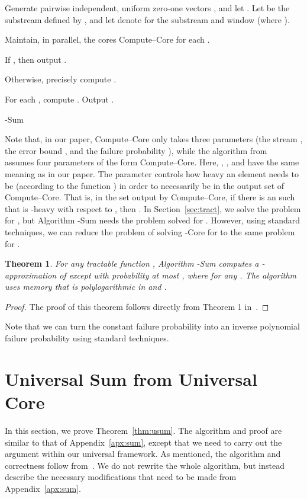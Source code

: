 \documentclass[11pt]{article}
\newtheorem{thm}{Theorem}
\begin{document}
\bigskip

\begin{algorithm}[H]\label{alg:gsum}
\DontPrintSemicolon
Generate  pairwise independent, uniform zero-one vectors ,
and let .
Let  be the substream defined by , and let  denote
 for the substream 
and window  (where ). \;

Maintain, in parallel, the cores  Compute--Core for each . \;

If , then output . \;

Otherwise, precisely compute . \;

For each , compute . \;
Output . \;
\caption{-Sum}
\end{algorithm}

Note that, in our paper, Compute--Core only takes three parameters (the stream , the
error bound , and the failure probability ), while the algorithm from~\cite{BO13} assumes
four parameters of the form Compute--Core.  Here, , , and 
have the same meaning as in our paper.  The parameter  controls how heavy an element needs to be
(according to the function ) in order to necessarily be in the output set of Compute--Core.  That is,
in the set  output by Compute--Core, if there is an  such that
 is -heavy with respect to , then .  In
Section~\ref{sec:tract}, we solve the problem for , but Algorithm -Sum needs the problem
solved for . However, using standard techniques, we can reduce the problem of
solving -Core for  to the same problem for .

\begin{thm}

For any tractable function , Algorithm -Sum computes a -approximation of 
except with probability at most , where  for any .
The algorithm uses memory that is polylogarithmic in  and .
\end{thm}

\begin{proof}
The proof of this theorem follows directly from Theorem 1 in~\cite{BO13}.
\end{proof}

\noindent Note that we can turn the constant failure probability into an inverse polynomial failure probability
using standard techniques.


\section{Universal Sum from Universal Core}\label{apx:sumcore}

In this section, we prove Theorem~\ref{thm:usum}. The algorithm and proof are similar to that of
Appendix~\ref{apx:sum}, except that we need to carry out the argument within our universal framework.
As mentioned, the algorithm and correctness follow from~\cite{BO13}.  We do not rewrite the whole algorithm,
but instead describe the necessary modifications that need to be made from Appendix~\ref{apx:sum}.
\end{document}
